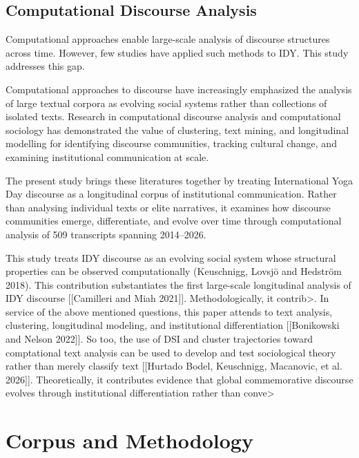 \documentclass[11pt]{article}
\begin{document}
\subsection{Computational Discourse Analysis}



Computational approaches enable large-scale analysis of discourse structures 
across time. However, few studies have applied such methods to IDY. 
This study addresses this gap.

Computational approaches to discourse have increasingly
emphasized the analysis of large textual corpora as evolving social
systems rather than collections of isolated texts. Research in
computational discourse analysis and computational sociology has
demonstrated the value of clustering, text mining, and longitudinal
modelling for identifying discourse communities, tracking cultural
change, and examining institutional communication at scale.

The present study brings these literatures together by treating
International Yoga Day discourse as a longitudinal corpus of
institutional communication. Rather than analysing individual texts or
elite narratives, it examines how discourse communities emerge,
differentiate, and evolve over time through computational analysis of
509 transcripts spanning 2014--2026.

This study treats IDY discourse as an evolving social system whose structural 
properties can be observed computationally (Keuschnigg, Lovsjö and Hedström 2018). 
This contribution substantiates the first large-scale longitudinal analysis of IDY 
discourse [[Camilleri and Miah 2021]]. Methodologically, it contrib>. In service of
 the above mentioned questions, this paper attends to text analysis, clustering, 
longitudinal modeling, and institutional differentiation [[Bonikowski and Nelson 2022]].
 So too, the use of DSI and cluster trajectories toward comptational text analysis can be
 used to develop and test sociological theory rather than merely classify text
 [[Hurtado Bodel, Keuschnigg, Macanovic, et al. 2026]]. Theoretically, it contributes evidence that 
global commemorative discourse evolves through institutional differentiation rather than conve>

 

\section{Corpus and Methodology}
\end{document}
